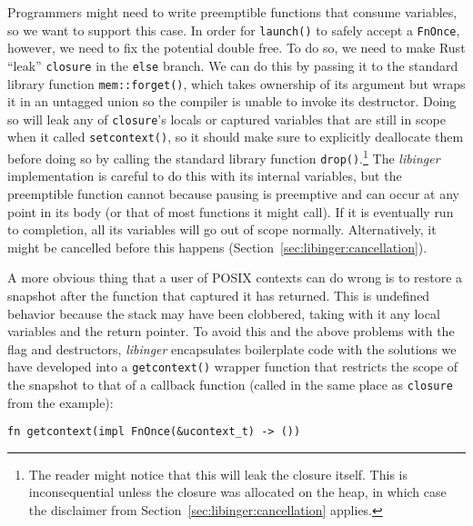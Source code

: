 Programmers might need to write preemptible functions that consume variables, so we
want to support this case.  In order for \texttt{launch()} to safely accept a
\texttt{FnOnce}, however, we need to fix the potential double free.  To do so, we
need to make Rust ``leak'' \texttt{closure} in the \texttt{else} branch.  We can do
this by passing it to the standard library function \texttt{mem::forget()}, which
takes ownership of its argument but wraps it in an untagged union so the compiler is
unable to invoke its destructor.  Doing so will leak any of \texttt{closure}'s locals
or captured variables that are still in scope when it called \texttt{setcontext()},
so it should make sure to explicitly deallocate them before doing so by calling the
standard library function \texttt{drop()}.\footnote{The reader might notice that this
will leak the closure itself.  This is inconsequential unless the closure was
allocated on the heap, in which case the disclaimer from
Section~\ref{sec:libinger:cancellation} applies.}  The \textit{libinger}
implementation is careful to do this with its internal variables, but the preemptible
function cannot because pausing is preemptive and can occur at any point in its body
(or that of most functions it might call).  If it is eventually run to completion,
all its variables will go out of scope normally.  Alternatively, it might be
cancelled before this happens (Section~\ref{sec:libinger:cancellation}).

A more obvious thing that a user of POSIX contexts can do wrong is to restore a
snapshot after the function that captured it has returned.  This is undefined
behavior because the stack may have been clobbered, taking with it any local
variables and the return pointer.  To avoid this and the above problems with the flag
and destructors, \textit{libinger} encapsulates boilerplate code with the solutions
we have developed into a \texttt{getcontext()} wrapper function that restricts the
scope of the snapshot to that of a callback function (called in the same place as
\texttt{closure} from the example):
\begin{lstlisting}[morekeywords={fn,impl,FnOnce}]
  fn getcontext(impl FnOnce(&ucontext_t) -> ())
\end{lstlisting}


\begin{promotesubsections}

\label{sec:libinger:stacks}






\end{promotesubsections}


